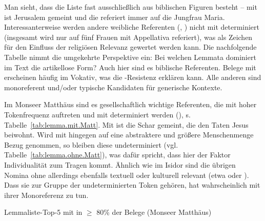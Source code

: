 Man sieht, dass die Liste fast ausschließlich aus biblischen Figuren besteht -- mit  ist Jerusalem gemeint und die  referiert immer auf die Jungfrau Maria. Interessanterweise werden andere weibliche Referenten (, ) nicht mit  determiniert (insgesamt wird nur auf fünf Frauen mit Appellativa referiert), was als Zeichen für den Einfluss der religiösen Relevanz gewertet werden kann. 
Die nachfolgende Tabelle nimmt die umgekehrte Perspektive ein: Bei welchen Lemmata dominiert im Text die artikellose Form? Auch hier sind es biblische Referenten. Belege mit  erscheinen häufig im Vokativ, was die -Resistenz erklären kann. Alle anderen sind monoreferent und/oder typische Kandidaten für generische Kontexte.



Im Monseer Matthäus sind es gesellschaftlich wichtige Referenten, die mit hoher Tokenfrequenz auftreten und mit  determiniert werden (), s. Tabelle~\ref{tab:lemma.mit.Matt}. Mit  ist die Schar gemeint, die den Taten Jesus beiwohnt. Wird mit  hingegen auf eine abstraktere und größere Menschenmenge Bezug genommen, so bleiben diese undeterminiert (vgl. Tabelle~\ref{tab:lemma.ohne.Matt}), was dafür spricht, dass hier der Faktor Individualität zum Tragen kommt. Ähnlich wie im Isidor sind die übrigen Nomina ohne  allerdings ebenfalls textuell  oder kulturell  relevant (etwa  oder ).  Dass sie zur Gruppe der undeterminierten Token gehören, hat wahrscheinlich mit ihrer Monoreferenz zu tun. 

  \begin{table}
      \resizebox{\textwidth}{!}{}
      \caption{Lemmaliste-Top-5 mit  in $\geq$ 80\% der Belege (Monseer Matthäus)\label{tab:lemma.mit.Matt}}
  \end{table}

